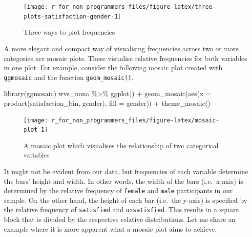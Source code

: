 \documentclass[
]{book}
\newenvironment{Shaded}{\begin{snugshade}}{\end{snugshade}}
\newcommand{\AttributeTok}[1]{\textcolor[rgb]{0.77,0.63,0.00}{#1}}
\newcommand{\FunctionTok}[1]{\textcolor[rgb]{0.00,0.00,0.00}{#1}}
\newcommand{\NormalTok}[1]{#1}
\newcommand{\SpecialCharTok}[1]{\textcolor[rgb]{0.00,0.00,0.00}{#1}}
\begin{document}
\begin{figure}

{\centering \texttt{[image: r\_for\_non\_programmers\_files/figure-latex/three-plots-satisfaction-gender-1]} 

}

\caption{Three ways to plot frequencies}\label{fig:three-plots-satisfaction-gender}
\end{figure}

A more elegant and compact way of visualising frequencies across two or more categories are mosaic plots. These visualise relative frequencies for both variables in one plot. For example, consider the following mosaic plot created with \texttt{ggmosaic} and the function \texttt{geom\_mosaic()}.

\begin{Shaded}
\begin{Highlighting}[]
\FunctionTok{library}\NormalTok{(ggmosaic)}
\NormalTok{wvs\_nona }\SpecialCharTok{\%\textgreater{}\%}
  \FunctionTok{ggplot}\NormalTok{() }\SpecialCharTok{+}
  \FunctionTok{geom\_mosaic}\NormalTok{(}\FunctionTok{aes}\NormalTok{(}\AttributeTok{x =} \FunctionTok{product}\NormalTok{(satisfaction\_bin, gender),}
                            \AttributeTok{fill =}\NormalTok{ gender)) }\SpecialCharTok{+}
  \FunctionTok{theme\_mosaic}\NormalTok{()}
\end{Highlighting}
\end{Shaded}

\begin{figure}

{\centering \texttt{[image: r\_for\_non\_programmers\_files/figure-latex/mosaic-plot-1]} 

}

\caption{A mosaic plot which visualises the relationship of two categorical variables}\label{fig:mosaic-plot}
\end{figure}

It might not be evident from our data, but frequencies of each variable determine the bars' height and width. In other words, the width of the bars (i.e.~x-axis) is determined by the relative frequency of \texttt{female} and \texttt{male} participants in our sample. On the other hand, the height of each bar (i.e.~the y-axis) is specified by the relative frequency of \texttt{satisfied} and \texttt{unsatisfied}. This results in a square block that is divided by the respective relative distributions. Let me share an example where it is more apparent what a mosaic plot aims to achieve.
\end{document}

